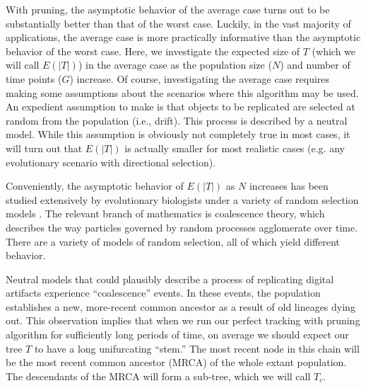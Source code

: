 
With pruning, the asymptotic behavior of the average case turns out to be substantially better than that of the worst case.
Luckily, in the vast majority of applications, the average case is more practically informative than the asymptotic behavior of the worst case.
Here, we investigate the expected size of $T$ (which we will call $E(|T|)$) in the average case as the population size ($N$) and number of time points ($G$) increase.
Of course, investigating the average case requires making some assumptions about the scenarios where this algorithm may be used.
An expedient assumption to make is that objects to be replicated are selected at random from the population (i.e., drift).
This process is described by a neutral model.
While this assumption is obviously not completely true in most cases, it will turn out that $E(|T|)$ is actually smaller for most realistic cases (e.g. any evolutionary scenario with directional selection).

Conveniently, the asymptotic behavior of $E(|T|)$ as $N$ increases has been studied extensively by evolutionary biologists under a variety of random selection models \citep{berestycki2009recent, tellier2014coalescence, nordborg2019coalescent}.
The relevant branch of mathematics is coalescence theory, which describes the way particles governed by random processes agglomerate over time.
There are a variety of models of random selection, all of which yield different behavior.

Neutral models that could plausibly describe a process of replicating digital artifacts experience ``coalescence'' events.
In these events, the population establishes a new, more-recent common ancestor as a result of old lineages dying out.
This observation implies that when we run our perfect tracking with pruning algorithm for sufficiently long periods of time, on average we should expect our tree $T$ to have a long unifurcating ``stem.''
The most recent node in this chain will be the most recent common ancestor (MRCA) of the whole extant population.
The descendants of the MRCA will form a sub-tree, which we will call $T_c$.

